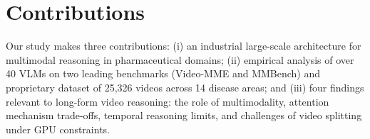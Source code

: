 \documentclass{article}
\begin{document}
\section{Contributions}

Our study makes three contributions: (i) an industrial large-scale architecture for multimodal reasoning in pharmaceutical domains; (ii) empirical analysis of over 40 VLMs on two leading benchmarks (Video-MME and MMBench) and proprietary dataset of 25,326 videos across 14 disease areas; and (iii) four findings relevant to long-form video reasoning: the role of multimodality, attention mechanism trade-offs, temporal reasoning limits, and challenges of video splitting under GPU constraints.
\end{document}
